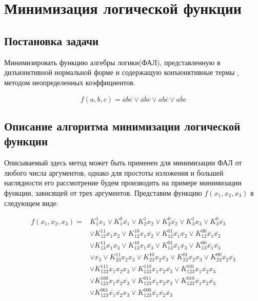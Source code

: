 \section{Минимизация логической функции}

\subsection{Постановка задачи}

Минимизировать функцию алгебры логики(ФАЛ), представленную в
дизъюнктивной нормальной форме и содержащую конъюнктивные термы ,
методом неопределенных коэффициентов.

\begin{equation}
\label{equation:section2:F}
     f(a,b,c) = {\overline{a}b\overline{c}} \lor {\overline{a}\overline{b}\overline{c}} \lor {ab\overline{c}} \lor {a\overline{b}c}
\end{equation}
\subsection{Описание алгоритма минимизации логической функции}

Описываемый здесь метод может быть применен для минимизации
ФАЛ от любого числа аргументов, однако для простоты изложения и большей наглядности его рассмотрение будем производить на примере минимизации функции, зависящей от трех аргументов. Представим функцию $f(x_1,x_2,x_3)$ в следующем виде:

\begin{equation}
\label{equation:sec2:viewF}
\begin{split}
f(x_1,x_2,x_3) = & K_1^1x_1 \lor K_1^0\overline{x_1} \lor K_2^1x_2 \lor K_2^0\overline{x_2} \lor K_3^1x_3 \lor K_3^0\overline{x_3} \\
&\lor K_{12}^{11}x_1x_2 \lor K_{12}^{10}x_1\overline{x_2} \lor K_{12}^{01}\overline{x_1}x_2 \lor K_{12}^{00}\overline{x_1}\overline{x_2} \\
&\lor K_{13}^{11}x_1x_3 \lor K_{13}^{10}x_1\overline{x_3} \lor K_{13}^{01}\overline{x_1}x_3 \lor K_{13}^{00}\overline{x_1}\overline{x_3} \\
&\lor \overline{x_3} \lor K_{23}^{11}x_2x_3 \lor K_{23}^{10}x_2\overline{x_3} \lor K_{23}^{01}\overline{x_2}x_3 \lor K_{23}^{00}\overline{x_2}\overline{x_3} \\
&\lor K_{123}^{111}x_1x_2x_3 \lor K_{123}^{110}x_1x_2\overline{x_3} \lor K_{123}^{101}x_1\overline{x_2}x_3 \\
&\lor K_{123}^{100}x_1\overline{x_2}\overline{x_3} \lor K_{123}^{011}\overline{x_1}x_2x_3 \lor K_{123}^{010}\overline{x_1}x_2\overline{x_3} \\
&\lor K_{123}^{001}\overline{x_1}\overline{x_2}x_3 \lor K_{123}^{000}\overline{x_1}\overline{x_2}\overline{x_3}
\end{split}
\end{equation}


